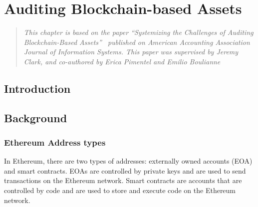 \chapter{Auditing Blockchain-based Assets} \label{sec:auditing}


\begin{quote}
	\textit{This chapter is based on the paper ``Systemizing the Challenges of Auditing Blockchain-Based Assets''~\cite{pimentel2021systemizing} published on American Accounting Association Journal of Information Systems. This paper was supervised by Jeremy Clark, and co-authored by Erica Pimentel and Emilio Boulianne}

\end{quote}









\section{Introduction} \label{sec:auditing:intro}






\section{Background} \label{sec:auditing:background}


\subsection{Ethereum Address types}
In Ethereum, there are two types of addresses: externally owned accounts (EOA) and smart contracts. EOAs are controlled by private keys and are used to send transactions on the Ethereum network. Smart contracts are accounts that are controlled by code and are used to store and execute code on the Ethereum network. 

